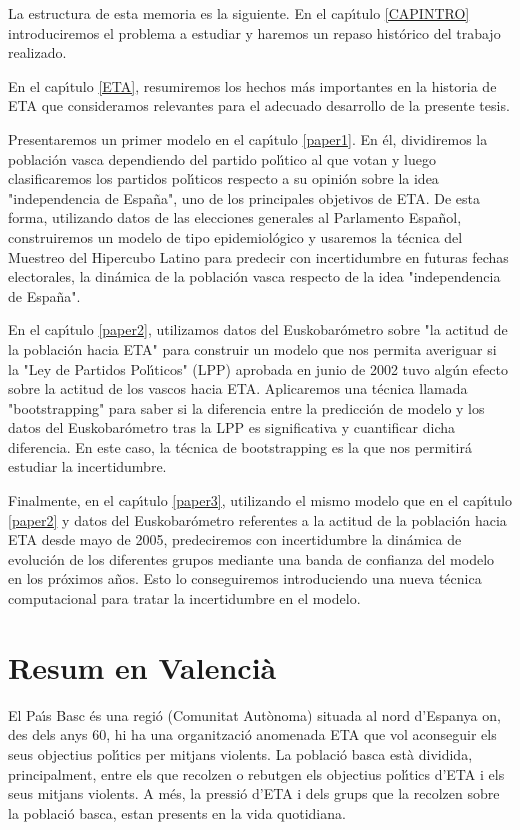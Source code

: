 La estructura de esta memoria es la siguiente. En el cap\'{\i}tulo \ref{CAPINTRO} introduciremos el problema a estudiar y haremos un repaso hist\'orico del trabajo realizado.

En el cap\'{\i}tulo \ref{ETA}, resumiremos los hechos m\'as importantes en la historia de ETA que consideramos relevantes para el adecuado desarrollo de la presente tesis.
 
Presentaremos un primer modelo en el cap\'{\i}tulo \ref{paper1}. En \'el, dividiremos la poblaci\'on vasca dependiendo del partido pol\'{\i}tico al que votan y luego clasificaremos los partidos pol\'{\i}ticos respecto a su opini\'on sobre la idea "independencia de Espa\~{n}a", uno de los principales objetivos de ETA. De esta forma, utilizando datos de las elecciones generales al Parlamento Espa\~{n}ol, construiremos un modelo de tipo epidemiol\'ogico y usaremos la t\'ecnica del Muestreo del Hipercubo Latino para predecir con incertidumbre en futuras fechas electorales, la din\'amica de la poblaci\'on vasca respecto de la idea "independencia de Espa\~{n}a". 

En el cap\'{\i}tulo \ref{paper2}, utilizamos datos del Euskobar\'ometro sobre "la actitud de la poblaci\'on hacia ETA" para construir un modelo que nos permita averiguar si la "Ley de Partidos Pol\'{\i}ticos" (LPP) aprobada en junio de 2002 tuvo alg\'un efecto sobre la actitud de los vascos hacia ETA. Aplicaremos una t\'ecnica llamada "bootstrapping" para saber si la diferencia entre la predicci\'on de modelo y los datos del Euskobar\'ometro tras la LPP es significativa y cuantificar dicha diferencia. En este caso, la t\'ecnica de bootstrapping es la que nos permitir\'a estudiar la incertidumbre. 

Finalmente, en el cap\'{\i}tulo \ref{paper3}, utilizando el mismo modelo que en el cap\'{\i}tulo \ref{paper2} y datos del Euskobar\'ometro referentes a la actitud de la poblaci\'on hacia ETA desde mayo de 2005, predeciremos con incertidumbre la din\'amica de evoluci\'on de los diferentes grupos mediante una banda de confianza del mo\-de\-lo en los pr\'oximos a\~{n}os. Esto lo conseguiremos introduciendo una nueva t\'ecnica computacional para tratar la incertidumbre en el modelo.

\chapter*{Resum en Valenci\`a}
El Pa\'{\i}s Basc \'es una regi\'o (Comunitat Aut\`onoma) situada al nord d'Espanya on, des dels anys 60, hi ha una organitzaci\'o anomenada ETA que vol aconseguir els seus objectius pol\'{\i}tics per mitjans violents. La poblaci\'o basca est\`a dividida, principalment, entre els que recolzen o rebutgen els objectius pol\'{\i}tics d'ETA i els seus mitjans violents. A m\'es, la pressi\'o d'ETA i dels grups que la recolzen sobre la poblaci\'o basca, estan presents en la vida quotidiana.

